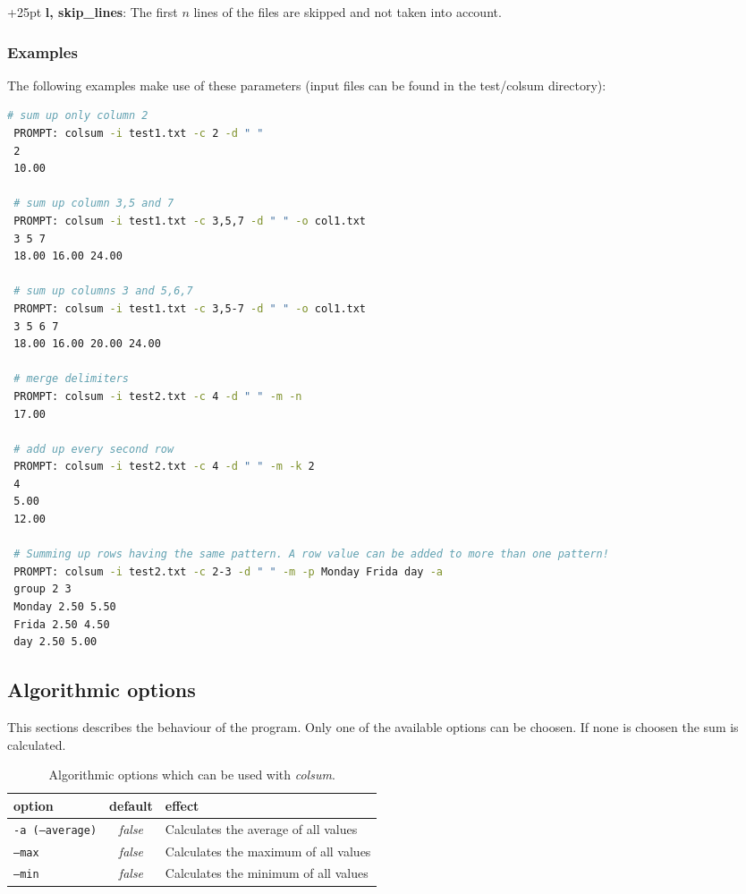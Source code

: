 \documentclass[a4paper,10pt,parskip=half]{scrreprt}
\begin{document}
\hangindent+25pt 
\textbf{l, skip\_lines}: The first $n$ lines of the files are skipped and not taken into account.

\subsubsection*{Examples}
The following examples make use of these parameters (input files can be found in the test/colsum directory):

\begin{lstlisting}[language=bash,frame=none,morekeywords={PROMPT}]
 # sum up only column 2
 PROMPT: colsum -i test1.txt -c 2 -d " "
 2
 10.00
 
 # sum up column 3,5 and 7
 PROMPT: colsum -i test1.txt -c 3,5,7 -d " " -o col1.txt
 3 5 7
 18.00 16.00 24.00
 
 # sum up columns 3 and 5,6,7
 PROMPT: colsum -i test1.txt -c 3,5-7 -d " " -o col1.txt
 3 5 6 7
 18.00 16.00 20.00 24.00
 
 # merge delimiters
 PROMPT: colsum -i test2.txt -c 4 -d " " -m -n
 17.00
 
 # add up every second row
 PROMPT: colsum -i test2.txt -c 4 -d " " -m -k 2
 4                                                                                                  
 5.00                                                                                                   
 12.00

 # Summing up rows having the same pattern. A row value can be added to more than one pattern!
 PROMPT: colsum -i test2.txt -c 2-3 -d " " -m -p Monday Frida day -a
 group 2 3
 Monday 2.50 5.50
 Frida 2.50 4.50
 day 2.50 5.00
\end{lstlisting}
 
 
 
\subsection{Algorithmic options}

This sections describes the behaviour of the program. Only one of the available options can be choosen. If none is choosen the sum is calculated.

\begin{table}[h]
\caption{Algorithmic options which can be used with \textit{colsum}.}
\begin{tabular}{lcp{7cm}}\hline
option& default & effect \\\hline
 \texttt{-a (--average)} &\textit{false}& Calculates the average of all values\\
 \texttt{--max} &\textit{false}& Calculates the maximum of all values\\
 \texttt{--min} &\textit{false}& Calculates the minimum of all values\\
 \end{tabular}
\end{table}
\end{document}
